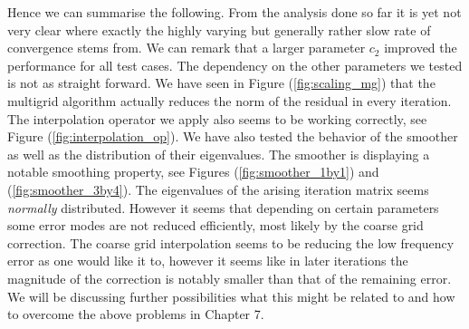 \documentclass[../draft_1.tex]{subfiles}
\begin{document}






 Hence we can summarise the following. From the analysis done so far it is yet not very clear where exactly the highly varying but generally rather slow rate of convergence stems from. We can remark that a larger parameter $c_2$ improved the performance for all test cases. The dependency on the other parameters we tested is not as straight forward. We have seen in Figure (\ref{fig:scaling_mg}) that the multigrid algorithm actually reduces the norm of the residual in every iteration. The interpolation operator we apply also seems to be working correctly, see Figure (\ref{fig:interpolation_op}). We have also tested the behavior of the smoother as well as the distribution of their eigenvalues. The smoother is displaying a notable smoothing property, see Figures (\ref{fig:smoother_1by1}) and (\ref{fig:smoother_3by4}). The eigenvalues of the arising iteration matrix seems \textit{normally} distributed. However it seems that depending on certain parameters some error modes are not reduced efficiently, most likely by the coarse grid correction. The coarse grid interpolation seems to be reducing the low frequency error as one would like it to, however it seems like in later iterations the magnitude of the correction is notably smaller than that of the remaining error. We will be discussing further possibilities what this might be related to and how to overcome the above problems in Chapter 7. 
\end{document}
